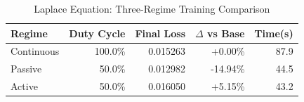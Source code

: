 \begin{table}[htbp]
\centering
\caption{Laplace Equation: Three-Regime Training Comparison}
\label{tab:laplace_regimes}
\begin{tabular}{lrrrr}
\hline
Regime & Duty Cycle & Final Loss & $\Delta$ vs Base & Time(s) \\
\hline
Continuous & 100.0\% & 0.015263 & +0.00\% & 87.9 \\
Passive & 50.0\% & 0.012982 & -14.94\% & 44.5 \\
Active & 50.0\% & 0.016050 & +5.15\% & 43.2 \\
\hline
\end{tabular}
\end{table}
